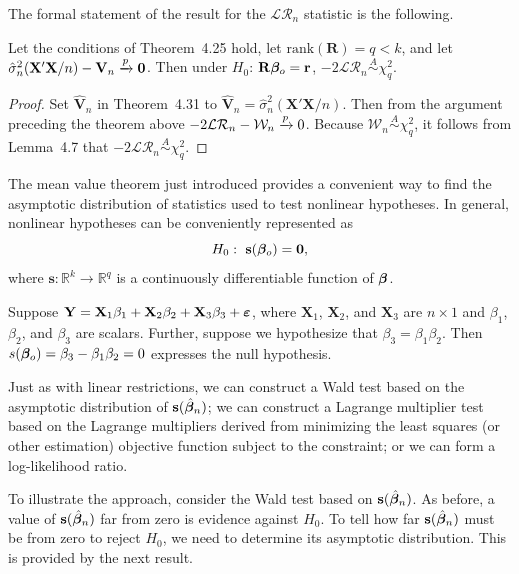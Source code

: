 The formal statement of the result for the $\mathcal{LR}_n$ statistic is the following.

\begin{theorem}\label{thm:4.37}
Let the conditions of Theorem~4.25 hold, let $\mathrm{rank}(\mathbf{R}) = q < k$, and let $\hat{\sigma}_n^2(\mathbf{X}'\mathbf{X}/n) - \mathbf{V}_n \xrightarrow{p} \mathbf{0}$. Then under $H_0$: $\mathbf{R}\boldsymbol{\beta}_o = \mathbf{r}$, $-2\mathcal{LR}_n \overset{A}{\sim} \chi_q^2$.
\end{theorem}

\begin{proof}
Set $\hat{\mathbf{V}}_n$ in Theorem~4.31 to $\hat{\mathbf{V}}_n = \hat{\sigma}_n^2(\mathbf{X}'\mathbf{X}/n)$. Then from the
argument preceding the theorem above $-2\mathcal{LR}_n - \mathcal{W}_n \xrightarrow{p} 0$. Because $\mathcal{W}_n \overset{A}{\sim}
\chi_q^2$, it follows from Lemma~4.7 that $-2\mathcal{LR}_n \overset{A}{\sim} \chi_q^2$.
\end{proof}

The mean value theorem just introduced provides a convenient way to
find the asymptotic distribution of statistics used to test nonlinear hypotheses. In general, nonlinear hypotheses can be conveniently represented
as
\[
H_0:\ \mathbf{s}(\boldsymbol{\beta}_o) = \mathbf{0},
\]
where $\mathbf{s}: \mathbb{R}^k \to \mathbb{R}^q$ is a continuously differentiable function of $\boldsymbol{\beta}$.

\begin{example}\label{ex:4.38}
Suppose $\mathbf{Y} = \mathbf{X}_1\beta_1 + \mathbf{X}_2\beta_2 + \mathbf{X}_3\beta_3 + \boldsymbol{\varepsilon}$, where $\mathbf{X}_1$, $\mathbf{X}_2$, and $\mathbf{X}_3$ are $n \times 1$ and $\beta_1$, $\beta_2$, and $\beta_3$ are scalars. Further, suppose we hypothesize that $\beta_3 = \beta_1\beta_2$. Then $s(\boldsymbol{\beta}_o) = \beta_3 - \beta_1\beta_2 = 0$ expresses the null hypothesis.
\end{example}

Just as with linear restrictions, we can construct a Wald test based on the
asymptotic distribution of $\mathbf{s}(\hat{\boldsymbol{\beta}}_n)$; we can construct a Lagrange multiplier
test based on the Lagrange multipliers derived from minimizing the least
squares (or other estimation) objective function subject to the constraint;
or we can form a log-likelihood ratio.

To illustrate the approach, consider the Wald test based on $\mathbf{s}(\hat{\boldsymbol{\beta}}_n)$. As
before, a value of $\mathbf{s}(\hat{\boldsymbol{\beta}}_n)$ far from zero is evidence against $H_0$. To tell how far
$\mathbf{s}(\hat{\boldsymbol{\beta}}_n)$ must be from zero to reject $H_0$, we need to determine its asymptotic
distribution. This is provided by the next result.

